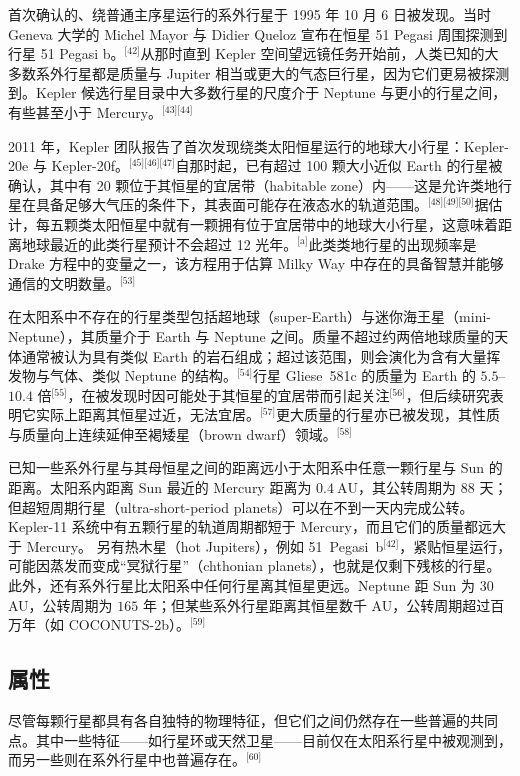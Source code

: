 首次确认的、绕普通主序星运行的系外行星于 1995 年 10 月 6 日被发现。当时 Geneva 大学的 Michel Mayor 与 Didier Queloz 宣布在恒星 51 Pegasi 周围探测到行星 51 Pegasi b。\(^\text{[42]}\)从那时直到 Kepler 空间望远镜任务开始前，人类已知的大多数系外行星都是质量与 Jupiter 相当或更大的气态巨行星，因为它们更易被探测到。Kepler 候选行星目录中大多数行星的尺度介于 Neptune 与更小的行星之间，有些甚至小于 Mercury。\(^\text{[43][44]}\)

2011 年，Kepler 团队报告了首次发现绕类太阳恒星运行的地球大小行星：Kepler-20e 与 Kepler-20f。\(^\text{[45][46][47]}\)自那时起，已有超过 100 颗大小近似 Earth 的行星被确认，其中有 20 颗位于其恒星的宜居带（habitable zone）内——这是允许类地行星在具备足够大气压的条件下，其表面可能存在液态水的轨道范围。\(^\text{[48][49][50]}\)据估计，每五颗类太阳恒星中就有一颗拥有位于宜居带中的地球大小行星，这意味着距离地球最近的此类行星预计不会超过 12 光年。\(^\text{[a]}\)此类类地行星的出现频率是 Drake 方程中的变量之一，该方程用于估算 Milky Way 中存在的具备智慧并能够通信的文明数量。\(^\text{[53]}\)

在太阳系中不存在的行星类型包括超地球（super-Earth）与迷你海王星（mini-Neptune），其质量介于 Earth 与 Neptune 之间。质量不超过约两倍地球质量的天体通常被认为具有类似 Earth 的岩石组成；超过该范围，则会演化为含有大量挥发物与气体、类似 Neptune 的结构。\(^\text{[54]}\)行星 Gliese~581c 的质量为 Earth 的 $5.5$--$10.4$ 倍\(^\text{[55]}\)，在被发现时因可能处于其恒星的宜居带而引起关注\(^\text{[56]}\)，但后续研究表明它实际上距离其恒星过近，无法宜居。\(^\text{[57]}\)更大质量的行星亦已被发现，其性质与质量向上连续延伸至褐矮星（brown dwarf）领域。\(^\text{[58]}\)

已知一些系外行星与其母恒星之间的距离远小于太阳系中任意一颗行星与 Sun 的距离。太阳系内距离 Sun 最近的 Mercury 距离为 $0.4\ \mathrm{AU}$，其公转周期为 $88$ 天；但超短周期行星（ultra-short-period planets）可以在不到一天内完成公转。Kepler-11 系统中有五颗行星的轨道周期都短于 Mercury，而且它们的质量都远大于 Mercury。  
另有热木星（hot Jupiters），例如 51~Pegasi~b\(^\text{[42]}\)，紧贴恒星运行，可能因蒸发而变成“冥狱行星”（chthonian planets），也就是仅剩下残核的行星。  
此外，还有系外行星比太阳系中任何行星离其恒星更远。Neptune 距 Sun 为 $30$ AU，公转周期为 $165$ 年；但某些系外行星距离其恒星数千 AU，公转周期超过百万年（如 COCONUTS-2b）。\(^\text{[59]}\)
\subsection{属性}
尽管每颗行星都具有各自独特的物理特征，但它们之间仍然存在一些普遍的共同点。其中一些特征——如行星环或天然卫星——目前仅在太阳系行星中被观测到，而另一些则在系外行星中也普遍存在。\(^\text{[60]}\)
